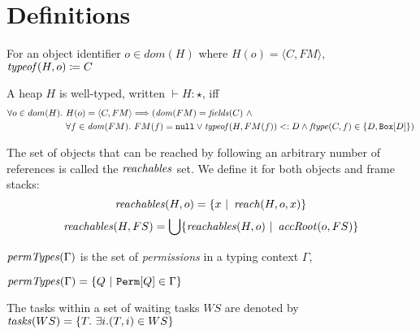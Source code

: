 \chapter{Definitions}
\begin{definition}
  For an object identifier $o \in dom(H)$ where $H(o) = \langle C, FM \rangle$, $\mathop{\mathit{typeof}}(H, o) \coloneq C$
\end{definition}

\begin{definition}\label{well-typed-heap}
A heap $H$ is well-typed, written $\vdash H : \star$, iff
\begin{alignat*}{3}
  \forall o \in dom(H).\ & H(o) = \langle C, FM \rangle \Longrightarrow
                         (\mathop{\mathit{dom}}(FM) = \mathop{\mathit{fields}}(C)\ \wedge\\
                         & \forall f \in \mathop{\mathit{dom}}(FM).\ FM(f)= \texttt{null} \vee \mathop{\mathit{typeof}}(H, FM(f)) <: D \wedge \mathop{\mathit{ftype}}(C, f) \in \{D, \texttt{Box}[D]\})
\end{alignat*}
\end{definition}

\begin{definition}[Reachables]
    The set of objects that can be reached by following an arbitrary number of references is called the $\mathop{\mathit{reachables}}$ set. We define it for both objects and frame stacks:
    \[
        \mathop{\mathit{reachables}}(H,o) = \{x\ |\ \mathop{\mathit{reach}}(H, o, x)\}
    \]
    \[
        \mathop{\mathit{reachables}}(H,FS) = \bigcup \{\mathop{\mathit{reachables}}(H, o)\ |\ \mathop{\mathit{accRoot}}(o, FS)\}
    \]
\end{definition}

\begin{definition}
    $\mathop{\mathit{permTypes}}(\Gamma)$ is the set of \textit{permissions} in a typing context $\Gamma$,

    $\vn{permTypes}(\Gamma) = \{Q\ |\ \mn{Perm}[Q] \in \Gamma \}$
\end{definition}

\begin{definition}[WS-Tasks]
    The tasks within a set of waiting tasks $WS$ are denoted by $\mathop{\mathit{tasks}}(WS) = \{T.\ \exists i. (T,i) \in WS\}$
\end{definition}


